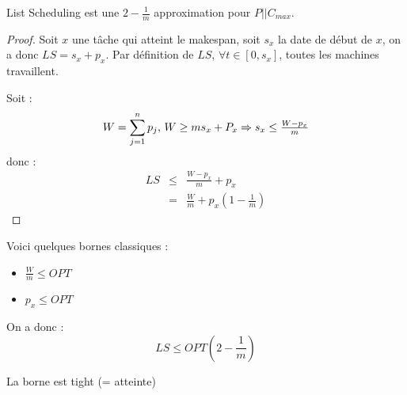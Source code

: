 \documentclass[a4paper, 11pt]{thesis}
\begin{document}
\begin{prop}
    List Scheduling est une $2 - \frac{1}{m}$ approximation pour $P||C_{max}$.
\end{prop}

\begin{proof}
    Soit $x$ une tâche qui atteint le makespan, soit $s_x$ la date de début de $x$,
    on a donc $ LS = s_x + p_x $. Par définition de $LS$, $\forall t \in [0, s_x]$, toutes les machines
    travaillent.

    Soit :
    \begin{displaymath}
        W = \sum_{j=1}^n p_j$, $W \geq m s_x + P_x \Rightarrow s_x \leq \frac{W - p_x}{m}
    \end{displaymath}
    donc : \begin{displaymath}
    \begin{array}{rcl}
        LS & \leq & \displaystyle \frac{W - p_x}{m} + p_x \\
           & = & \displaystyle \frac{W}{m} + p_x \left ( 1 - \frac{1}{m} \right )
    \end{array}
    \end{displaymath}
\end{proof}

\begin{lemma}
    Voici quelques bornes classiques :
    \begin{itemize}
        \item $\frac{W}{m} \leq OPT$
        \item $p_x \leq OPT$
    \end{itemize}
\end{lemma}

On a donc : \begin{displaymath}
LS \leq OPT \left ( 2 - \frac{1}{m} \right ) \end{displaymath}

\begin{thrm}
    La borne est tight (= atteinte)
\end{thrm} 
\end{document}
